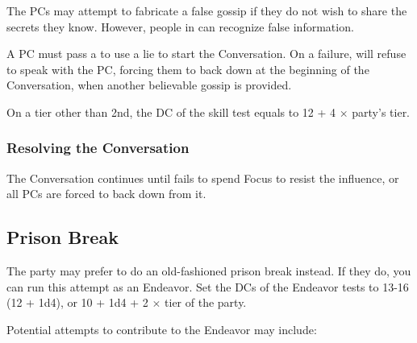 The PCs may attempt to fabricate a false gossip if they do not wish to share the secrets they know. However, people in \locationTashikk{} can recognize false information. 

A PC must pass a  to use a lie to start the Conversation. On a failure, \npcGossipGuard{} will refuse to speak with the PC, forcing them to back down at the beginning of the Conversation, when another believable gossip is provided.

On a tier other than 2nd, the DC of the skill test equals to 12 + 4 $\times$ party's tier.


\newpage
\subsubsection{Resolving the Conversation}

The Conversation continues until \npcGossipGuard{} fails to spend Focus to resist the influence, or all PCs are forced to back down from it.





\subsection{Prison Break}

The party may prefer to do an old-fashioned prison break instead. If they do, you can run this attempt as an Endeavor. Set the DCs of the Endeavor tests to 13-16 (12 + 1d4), or 10 + 1d4 + 2 $\times$ tier of the party.


Potential attempts to contribute to the Endeavor may include:



